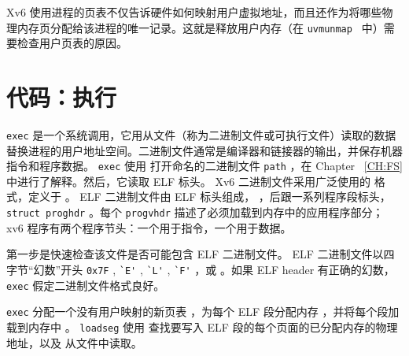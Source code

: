 \documentclass[UTF8]{article}
\begin{document}
Xv6 使用进程的页表不仅告诉硬件如何映射用户虚拟地址，而且还作为将哪些物理内存页分配给该进程的唯一记录。这就是释放用户内存（在  {    \tt    uvmunmap   }  中）需要检查用户页表的原因。
    \section{代码：执行  }   
    \lstinline{exec}    是一个系统调用，它用从文件（称为二进制文件或可执行文件）读取的数据替换进程的用户地址空间。二进制文件通常是编译器和链接器的输出，并保存机器指令和程序数据。
    \lstinline{exec}           使用        打开命名的二进制文件    \lstinline{path}   
        ，在 Chapter~    \ref{CH:FS}    中进行了解释。然后，它读取 ELF 标头。 Xv6 二进制文件采用广泛使用的        格式，定义于
        。 ELF 二进制文件由 ELF 标头组成，
               ，后跟一系列程序段标头，
    \lstinline{struct proghdr}           。每个
    \lstinline{progvhdr}    描述了必须加载到内存中的应用程序部分； xv6 程序有两个程序节头：一个用于指令，一个用于数据。  

第一步是快速检查该文件是否可能包含 ELF 二进制文件。 ELF 二进制文件以四字节“幻数”开头
    \lstinline{0x7F}    ,
    \lstinline{`E'}    ,
    \lstinline{`L'}    ,
    \lstinline{`F'}   ，或
        。如果 ELF header 有正确的幻数，
    \lstinline{exec}    假定二进制文件格式良好。  

   \lstinline{exec}    分配一个没有用户映射的新页表
        ，为每个 ELF 段分配内存
        ，并将每个段加载到内存中
        。
    \lstinline{loadseg}    使用
        查找要写入 ELF 段的每个页面的已分配内存的物理地址，以及
        从文件中读取。  
\end{document}
